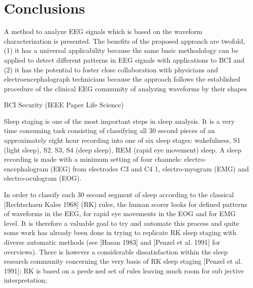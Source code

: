 \chapter{Conclusions}

A method to analyze EEG signals which is based on the waveform characterization is presented. The benefits of the proposed approach are twofold, (1) it has a universal applicability because the same basic methodology can be applied to detect different patterns in EEG signals with applications to BCI and (2) it has the potential to foster close collaboration with physicians and electroencephalograph technicians because the approach follows the established procedure of the clinical EEG community of analyzing waveforms by their shapes


BCI Security (IEEE Paper Life Science)



Sleep staging is one of the most important steps in sleep analysis. It is
a very time consuming task consisting of classifying all 30 second pieces
of an approximately eight hour recording into one of six sleep stages:
wakefulness, S1 (light sleep), S2, S3, S4 (deep sleep), REM (rapid eye
movement) sleep. A sleep recording is made with a minimum setting
of four channels: electro-encephalogram (EEG) from electrodes C3 and
C4 1, electro-myogram (EMG) and electro-oculogram (EOG). 

In order
to classify each 30 second segment of sleep according to the classical
[Rechtschaen  Kales 1968] (RK) rules, the human scorer looks for
defined patterns of waveforms in the EEG, for rapid eye movements in
the EOG and for EMG level. It is therefore a valuable goal to try and
automate this process and quite some work has already been done in
trying to replicate RK sleep staging with diverse automatic methods (see
[Hasan 1983] and [Penzel et al. 1991] for overviews). There is however a
considerable dissatisfaction within the sleep research community concerning
the very basis of RK sleep staging [Penzel et al. 1991]: RK is based on
a predened set of rules leaving much room for sub jective interpretation;